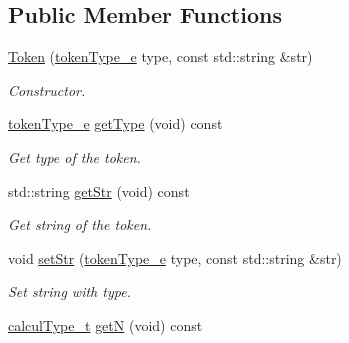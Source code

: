 \subsection*{Public Member Functions}
\begin{DoxyCompactItemize}
\item 
\hyperlink{class_token_ad84c27d6c4587fd359ffa52004bd370b}{Token} (\hyperlink{class_token_a706d105bff3282a406a9b218fcee1bfc}{token\+Type\+\_\+e} type, const std\+::string \&str)
\begin{DoxyCompactList}\small\item\em Constructor. \end{DoxyCompactList}\item 
\hypertarget{class_token_a1e326d33b7212772f3785fac4c3662be}{}\hyperlink{class_token_a706d105bff3282a406a9b218fcee1bfc}{token\+Type\+\_\+e} \hyperlink{class_token_a1e326d33b7212772f3785fac4c3662be}{get\+Type} (void) const \label{class_token_a1e326d33b7212772f3785fac4c3662be}

\begin{DoxyCompactList}\small\item\em Get type of the token. \end{DoxyCompactList}\item 
\hypertarget{class_token_ad38a4d20573a9c6c4bc2447a4701b51d}{}std\+::string \hyperlink{class_token_ad38a4d20573a9c6c4bc2447a4701b51d}{get\+Str} (void) const \label{class_token_ad38a4d20573a9c6c4bc2447a4701b51d}

\begin{DoxyCompactList}\small\item\em Get string of the token. \end{DoxyCompactList}\item 
\hypertarget{class_token_a5fbdba95469bc2afbaedf161e86d6d94}{}void \hyperlink{class_token_a5fbdba95469bc2afbaedf161e86d6d94}{set\+Str} (\hyperlink{class_token_a706d105bff3282a406a9b218fcee1bfc}{token\+Type\+\_\+e} type, const std\+::string \&str)\label{class_token_a5fbdba95469bc2afbaedf161e86d6d94}

\begin{DoxyCompactList}\small\item\em Set string with type. \end{DoxyCompactList}\item 
\hypertarget{class_token_afc6828db91b34b4b13afd9383b829c78}{}\hyperlink{mpfr_interface_8h_a16492006127cd422340be2441c22c14b}{calcul\+Type\+\_\+t} \hyperlink{class_token_afc6828db91b34b4b13afd9383b829c78}{get\+N} (void) const \label{class_token_afc6828db91b34b4b13afd9383b829c78}


\end{DoxyCompactItemize}
